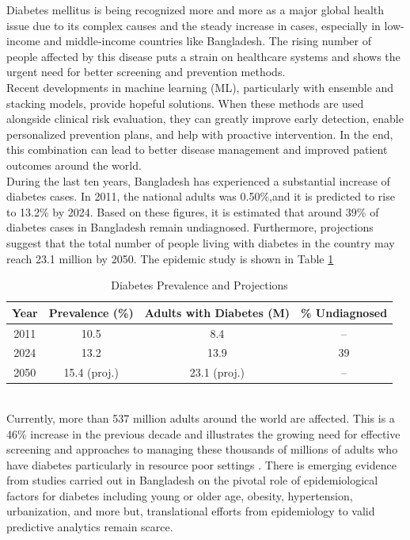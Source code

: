 \documentclass[conference, letterpaper]{IEEEtran}
\begin{document}
Diabetes mellitus is being recognized more and more as a major global health issue due to its complex causes and the steady increase in cases, especially in low-income and middle-income countries like Bangladesh. The rising number of people affected by this disease puts a strain on healthcare systems and shows the urgent need for better screening and prevention methods. \\Recent developments in machine learning (ML), particularly with ensemble and stacking models, provide hopeful solutions. When these methods are used alongside clinical risk evaluation, they can greatly improve early detection, enable personalized prevention plans, and help with proactive intervention. In the end, this combination can lead to better disease management and improved patient outcomes around the world.\\
During the last ten years, Bangladesh has experienced a substantial increase of diabetes cases. In 2011, the national adults was 0.50\%,and it is predicted to rise to 13.2\% by 2024\cite{pmc11964274}. Based on these figures, it is estimated that around 39\% of diabetes cases in Bangladesh remain undiagnosed. Furthermore, projections suggest that the total number of people living with diabetes in the country may reach 23.1 million by 2050. The epidemic study is shown in Table \ref{tab:diabetes prevelence} 
\\
\begin{table}[h!]
\centering
\caption{Diabetes Prevalence and Projections}
\label{tab:diabetes prevelence}
\renewcommand{\arraystretch}{1} %
\setlength{\tabcolsep}{4pt} %
\begin{tabular}{|c|c|c|c|}
\hline
\textbf{Year} & \textbf{Prevalence (\%)} & \textbf{Adults with Diabetes (M)} & \textbf{\% Undiagnosed} \\ 
\hline
2011 & 10.5 & 8.4 & -- \\ 
\hline
2024 & 13.2 & 13.9 & 39 \\ 
\hline
2050 & 15.4 (proj.) & 23.1 (proj.) & -- \\ 
\hline
\end{tabular}
\end{table}
\\
Currently, more than 537 million adults around the world are affected. This is a 46\% increase in the previous decade and illustrates the growing need for effective screening and approaches to managing these thousands of millions of adults who have diabetes particularly in resource poor settings \cite{diabetesatlas2025}. There is emerging evidence from studies carried out in Bangladesh on the pivotal role of epidemiological factors for diabetes including young or older age, obesity, hypertension, urbanization, and more but, translational efforts from epidemiology to valid predictive analytics remain scarce\cite{bayesianbangladesh}.
\end{document}
